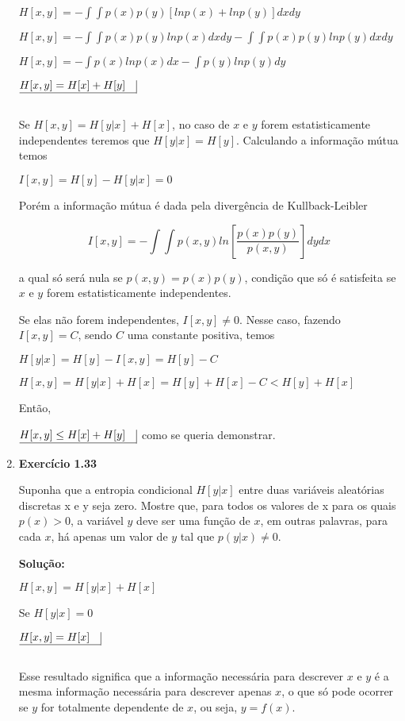 \begin{enumerate}
$H[x,y] = \displaystyle - \int \int p(x)p(y) [ln p(x) + ln p(y)] dx dy$

$H[x,y] = \displaystyle - \int \int p(x)p(y) ln p(x) dx dy - \int \int p(x)p(y) ln p(y) dx dy$

$H[x,y] = \displaystyle - \int p(x) ln p(x) dx - \int p(y) ln p(y) dy$

$\underline{H[x,y] = H[x] + H[y] \quad} \vline$

$ $

Se $H[x,y] = H[y|x] + H[x]$, no caso de $x$ e $y$ forem estatisticamente independentes teremos que $H[y|x] = H[y]$. Calculando a informação mútua temos

$I[x,y] = H[y]-H[y|x] = 0$

Porém a informação mútua é dada pela divergência de Kullback-Leibler 

$$I[x,y] = \displaystyle - \int \int p(x,y) ln\left[ \dfrac{p(x)p(y)}{p(x,y)}  \right] dy dx $$ 

a qual só será nula se $p(x,y) = p(x)p(y)$, condição que só é satisfeita se $x$ e $y$ forem estatisticamente independentes.

Se elas não forem independentes, $I[x,y] \neq 0$. Nesse caso, fazendo $I[x,y] = C$, sendo $C$ uma constante positiva, temos

$H[y|x] = H[y] - I[x,y] = H[y] - C$

$H[x,y] = H[y|x] + H[x] = H[y] + H[x] - C < H[y] + H[x]$

Então, 

$\underline{H[x,y] \leq H[x] + H[y] \quad} \vline$ como se queria demonstrar.



\item \textbf{Exercício 1.33} \par

Suponha que a entropia condicional $H[y|x]$ entre duas variáveis aleatórias discretas x e y seja zero. Mostre que, para todos os valores de x para os quais $p(x) > 0$, a variável $y$ deve ser uma função de $x$, em outras palavras, para cada $x$, há apenas um valor de $y$ tal que $p(y|x) \neq 0$.
\newline \par
\textbf{Solução:}

$H[x,y] = H[y|x] + H[x]$

Se $H[y|x]=0$ 

$\underline{H[x,y] = H[x] \quad} \vline$

$ $

Esse resultado significa que a informação necessária para descrever $x$ e $y$ é a mesma informação necessária para descrever apenas $x$, o que só pode ocorrer se $y$ for totalmente dependente de $x$, ou seja, $y=f(x)$.


\end{enumerate}

